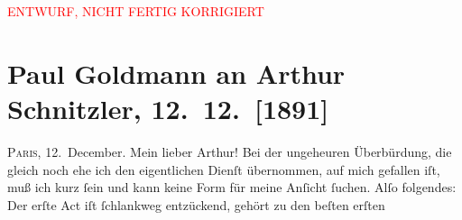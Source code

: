 
\begin{center}
            \textcolor{red}{ENTWURF, NICHT FERTIG KORRIGIERT}
                      \end{center}
            
         
         \renewcommand{\erwaehntePersonen}{Personen: Émile Augier, Richard Beer-Hofmann, Gerhart Hauptmann, Theodor Herzl, Hugo von Hofmannsthal, Friedrich Kapper, Hermann Sudermann, Émile Zola}
         \renewcommand{\erwaehnteInstitutionen}{Institutionen: Volkstheater}
         \renewcommand{\erwaehnteOrte}{Orte: Berlin, Brüssel, Paris, Sankt Petersburg, Wien}
         \renewcommand{\erwaehnteWerke}{Werke: Das Märchen. Schauspiel in drei Aufzügen}
               \section[Paul Goldmann an Arthur Schnitzler, 12. 12. {[}1891{]}]{ Paul Goldmann an Arthur Schnitzler, 12. 12. {[}1891{]}}\nopagebreak{}\rehead{ }\begin{ledgroupsized}[t]{13cm}\normalsize\beginnumbering \toendnotes[C]{\smallbreak\pagebreak[2]} 
\toendnotes[C]{\smallbreak}\pstart
           \raggedleft{}{\pb}\textsc{Paris}, 12. December.\pend
           \pstart\center{}Mein lieber Arthur!\pend\pstart
           Bei der ungeheuren Überbürdung, die gleich noch ehe ich den eigentlichen Dienſt
               übernommen, auf mich gefallen iſt, muß ich kurz ſein und kann keine Form für meine
               Anſicht ſuchen. Alſo folgendes: Der erſte Act iſt ſchlankweg entzückend, gehört zu den beſten erſten

\end{ledgroupsized}
